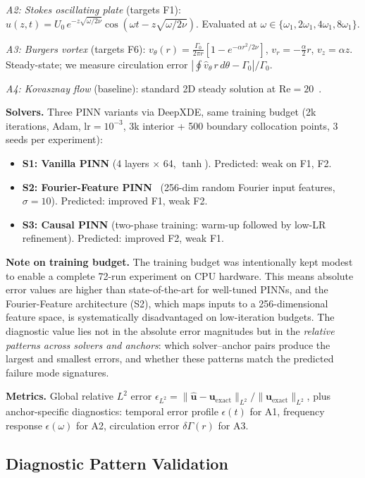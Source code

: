 \documentclass[conference]{IEEEtran}
\begin{document}
\emph{A2: Stokes oscillating plate} (targets F1):
$u(z,t) = U_0\, e^{-z\sqrt{\omega/2\nu}} \cos(\omega t - z\sqrt{\omega/2\nu}).$
Evaluated at $\omega \in \{\omega_1, 2\omega_1, 4\omega_1, 8\omega_1\}$.

\emph{A3: Burgers vortex} (targets F6):
$v_\theta(r) = \frac{\Gamma_0}{2\pi r}[1 - e^{-\alpha r^2/2\nu}]$, $v_r = -\frac{\alpha}{2}r$, $v_z = \alpha z.$
Steady-state; we measure circulation error $|\oint \hat{v}_\theta\,r\,d\theta - \Gamma_0|/\Gamma_0$.

\emph{A4: Kovasznay flow} (baseline): standard 2D steady solution at $\mathrm{Re}=20$~\cite{Drazin2006}.

\textbf{Solvers.} Three PINN variants via DeepXDE, same training budget (2k iterations, Adam, $\mathrm{lr}=10^{-3}$, 3k interior + 500 boundary collocation points, 3 seeds per experiment):
\begin{itemize}
  \item \textbf{S1: Vanilla PINN} (4 layers $\times$ 64, $\tanh$). Predicted: weak on F1, F2.
  \item \textbf{S2: Fourier-Feature PINN}~\cite{Wang2021} (256-dim random Fourier input features, $\sigma = 10$). Predicted: improved F1, weak F2.
  \item \textbf{S3: Causal PINN} (two-phase training: warm-up followed by low-LR refinement). Predicted: improved F2, weak F1.
\end{itemize}
\textbf{Note on training budget.} The training budget was intentionally kept modest to enable a complete 72-run experiment on CPU hardware. This means absolute error values are higher than state-of-the-art for well-tuned PINNs, and the Fourier-Feature architecture (S2), which maps inputs to a 256-dimensional feature space, is systematically disadvantaged on low-iteration budgets. The diagnostic value lies not in the absolute error magnitudes but in the \emph{relative patterns across solvers and anchors}: which solver--anchor pairs produce the largest and smallest errors, and whether these patterns match the predicted failure mode signatures.

\textbf{Metrics.} Global relative $L^2$ error $\epsilon_{L^2} = \|\hat{\mathbf{u}} - \mathbf{u}_{\mathrm{exact}}\|_{L^2}/\|\mathbf{u}_{\mathrm{exact}}\|_{L^2}$, plus anchor-specific diagnostics: temporal error profile $\epsilon(t)$ for A1, frequency response $\epsilon(\omega)$ for A2, circulation error $\delta\Gamma(r)$ for A3.


\subsection{Diagnostic Pattern Validation}
\end{document}

